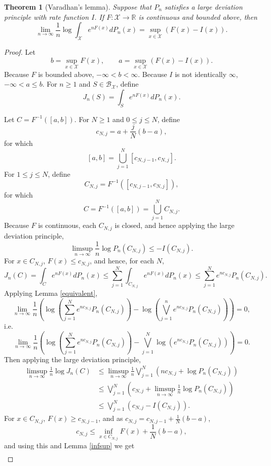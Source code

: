 \documentclass{article}
\newtheorem{theorem}{Theorem}
\theoremstyle{definition}
\begin{document}
\begin{theorem}[Varadhan's lemma]
Suppose that $P_n$ satisfies a large deviation principle with rate function $I$. If $F:\mathcal{X}
\to \mathbb{R}$ is continuous and bounded  above, then
\[
\lim_{n \to \infty} \frac{1}{n} \log \int_\mathcal{X} e^{nF(x)} dP_n(x)
=\sup_{x \in \mathcal{X}} (F(x)-I(x)).
\]
\end{theorem}
\begin{proof}
Let
\[
b=\sup_{x \in \mathcal{X}} F(x), \qquad a = \sup_{x \in \mathcal{X}} (F(x)-I(x)).
\]
Because $F$ is bounded  above, $-\infty<b<\infty$.
Because $I$ is not identically $\infty$,
$-\infty<a \leq b$. 
For $n \geq 1$ and
$S \in \mathscr{B}_{\mathcal{X}}$, 
define
\[
J_n(S) = \int_S e^{nF(x)} dP_n(x).
\]

Let $C=F^{-1}([a,b])$. For $N \geq 1$ and $0 \leq j \leq N$, define
\[
c_{N,j} = a + \frac{j}{N}(b-a),
\]
for which
\[
[a,b] = \bigcup_{j=1}^N [c_{N,j-1},c_{N,j}].
\]
For $1 \leq j \leq N$, define
\[
C_{N,j} = F^{-1}([c_{N,j-1},c_{N,j}]),
\]
for which
\[
C=F^{-1}([a,b]) = \bigcup_{j=1}^N C_{N,j}.
\]
Because $F$ is continuous, each $C_{N,j}$ is closed, and hence applying the large deviation principle,
\[
\limsup_{n \to \infty} \frac{1}{n} \log P_n(C_{N,j}) \leq -I(C_{N,j}).
\]
For $x \in C_{N,j}$, $F(x) \leq c_{N,j}$, and hence, for each $N$,
\[
J_n(C) = \int_C e^{nF(x)} dP_n(x)
\leq \sum_{j=1}^N \int_{C_{N,j}} e^{nF(x)} dP_n(x)
\leq \sum_{j=1}^N e^{nc_{N,j}} P_n(C_{N,j}).
\]
Applying Lemma \ref{equivalent},
\[
\lim_{n \to \infty} \frac{1}{n} \left(\log\left(\sum_{j=1}^N e^{nc_{N,j}} P_n(C_{N,j})\right)
-\log\left(\bigvee_{j=1}^n e^{nc_{N,j}} P_n(C_{N,j}) \right) \right)=0,
\]
i.e.
\[
\lim_{n \to \infty} \frac{1}{n} \left( \log\left(\sum_{j=1}^N e^{nc_{N,j}} P_n(C_{N,j})\right)
-\bigvee_{j=1}^N \log(e^{nc_{N,j}} P_n(C_{N,j})) \right)=0.
\]
Then applying the large deviation principle,
\begin{align*}
\limsup_{n \to \infty} \frac{1}{n}\log J_n(C)&\leq \limsup_{n \to \infty} \frac{1}{n} \bigvee_{j=1}^N \left(nc_{N,j}
+\log P_n(C_{N,j})\right)\\
&\leq \bigvee_{j=1}^N \left( c_{N,j} + \limsup_{n \to \infty} \frac{1}{n}  \log P_n(C_{N,j})\right)\\
&\leq  \bigvee_{j=1}^N \left( c_{N,j}  - I(C_{N,j})\right).
\end{align*}
For $x \in C_{N,j}$, $F(x) \geq c_{N,j-1}$, and as $c_{N,j} = c_{N,j-1}+\frac{1}{N}(b-a)$,
\[
c_{N,j} \leq \inf_{x \in C_{N,j}} F(x) + \frac{1}{N}(b-a),
\]
and using this and Lemma \ref{infsup} we get
\begin{align*}

\end{align*}
\end{proof}
\end{document}
